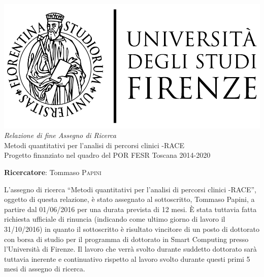 \documentclass{article}
\begin{document}
    
    \begin{center}
        \includegraphics[scale=0.2]{logo_unifi.jpg}\\[4cm]
        \textit{Relazione di fine Assegno di Ricerca}\\[0.3cm]
        {\Huge Metodi quantitativi per l'analisi di percorsi clinici -RACE}\\[0.2cm]
        Progetto finanziato nel quadro del POR FESR Toscana 2014-2020
    \end{center}
    
    \vfill
    
    \textbf{Ricercatore}: Tommaso \textsc{Papini}
    
    \clearpage
    
    L'assegno di ricerca ``Metodi quantitativi per l'analisi di percorsi clinici -RACE'', oggetto di questa relazione, è stato assegnato al sottoscritto, Tommaso Papini, a partire dal 01/06/2016 per una durata prevista di 12 mesi. È stata tuttavia fatta richiesta ufficiale di rinuncia (indicando come ultimo giorno di lavoro il 31/10/2016) in quanto il sottoscritto è risultato vincitore di un posto di dottorato con borsa di studio per il programma di dottorato in Smart Computing presso l'Università di Firenze. Il lavoro che verrà svolto durante suddetto dottorato sarà tuttavia inerente e continuativo rispetto al lavoro svolto durante questi primi 5 mesi di assegno di ricerca.
    
    
    
    
    \cite{mascots16}
    
    \clearpage
    
	
	
\end{document}
